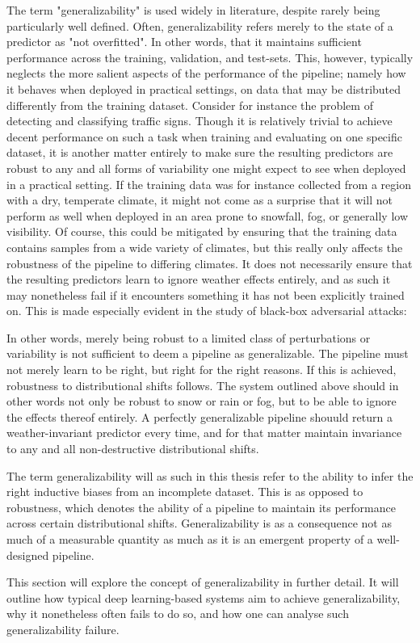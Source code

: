 	The term "generalizability" is used widely in literature, despite rarely being particularly well defined. Often, generalizability refers merely to the state of a predictor as "not overfitted". In other words, that it maintains sufficient performance across the training, validation, and test-sets. This, however, typically neglects the more salient aspects of the performance of the pipeline; namely how it behaves when deployed in practical settings, on data that may be distributed differently from the training dataset. Consider for instance the problem of detecting and classifying traffic signs. Though it is relatively trivial to achieve decent performance on such a task when training and evaluating on one specific dataset, it is another matter entirely to make sure the resulting predictors are robust to any and all forms of variability one might expect to see when deployed in a practical setting. If the training data was for instance collected from a region with a dry, temperate climate, it might not come as a surprise that it will not perform as well when deployed in an area prone to snowfall, fog, or generally low visibility. Of course, this could be mitigated by ensuring that the training data contains samples from a wide variety of climates, but this really only affects the robustness of the pipeline to differing climates. It does not necessarily ensure that the resulting predictors learn to ignore weather effects entirely, and as such it may nonetheless fail if it encounters something it has not been explicitly trained on. This is made especially evident in the study of black-box adversarial attacks: %
	        
	In other words, merely being robust to a limited class of perturbations or variability is not sufficient to deem a pipeline as generalizable. The pipeline must not merely learn to be right, but right for the right reasons. If this is achieved, robustness to distributional shifts follows. The system outlined above should in other words not only be robust to snow or rain or fog, but to be able to ignore the effects thereof entirely. A perfectly generalizable pipeline shouuld return a weather-invariant predictor every time, and for that matter maintain invariance to any and all non-destructive distributional shifts. 
	        
	The term generalizability will as such in this thesis refer to the ability to infer the right inductive biases from an incomplete dataset. This is as opposed to robustness, which denotes the ability of a pipeline to maintain its performance across certain distributional shifts. Generalizability is as a consequence not as much of a measurable quantity as much as it is an emergent property of a well-designed pipeline. 
	        
	This section will explore the concept of generalizability in further detail. It will outline how typical deep learning-based systems aim to achieve generalizability, why it nonetheless often fails to do so, and how one can analyse such generalizability failure.